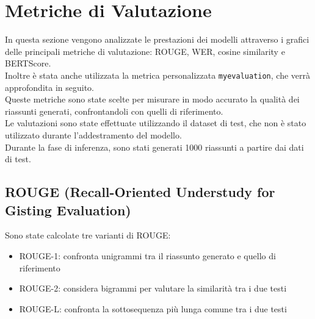 \section{Metriche di Valutazione}
In questa sezione vengono analizzate le prestazioni dei modelli attraverso i grafici delle principali metriche di valutazione: ROUGE, WER, cosine similarity e BERTScore.\\
Inoltre è stata anche utilizzata la metrica personalizzata \texttt{myevaluation}, che verrà approfondita in seguito.\\ 
Queste metriche sono state scelte per misurare in modo accurato la qualit\`a dei riassunti generati, confrontandoli con quelli di riferimento.\\
Le valutazioni sono state effettuate utilizzando il dataset di test, che non \`e stato utilizzato durante l'addestramento del modello.\\
Durante la fase di inferenza, sono stati generati 1000 riassunti a partire dai dati di test.

\subsection{ROUGE (Recall-Oriented Understudy for Gisting Evaluation)}
Sono state calcolate tre varianti di ROUGE:
\begin{itemize}
    \item ROUGE-1: confronta unigrammi tra il riassunto generato e quello di riferimento
    \item ROUGE-2: considera bigrammi per valutare la similarit\`a tra i due testi
    \item ROUGE-L: confronta la sottosequenza pi\`u lunga comune tra i due testi
\end{itemize}    

